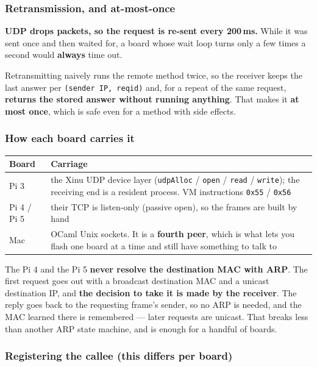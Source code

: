 \documentclass[11pt,a4paper]{article}
\begin{document}
\subsubsection*{Retransmission, and at-most-once}

\textbf{UDP drops packets, so the request is re-sent every 200\,ms.} While it
was sent once and then waited for, a board whose wait loop turns only a few
times a second would \textbf{always} time out.

Retransmitting naively runs the remote method twice, so the receiver keeps the
last answer per \texttt{(sender IP, reqid)} and, for a repeat of the same
request, \textbf{returns the stored answer without running anything}. That makes
it \textbf{at most once}, which is safe even for a method with side effects.

\subsubsection*{How each board carries it}

\begin{center}
\small
\begin{tabular}{@{}lp{8.4cm}@{}}
\toprule
Board & Carriage \\
\midrule
Pi 3 & the Xinu UDP device layer (\texttt{udpAlloc} / \texttt{open} /
       \texttt{read} / \texttt{write}); the receiving end is a resident process.
       VM instructions \texttt{0x55} / \texttt{0x56} \\
Pi 4 / Pi 5 & their TCP is listen-only (passive open), so the frames are built
       by hand \\
Mac & OCaml Unix sockets. It is a \textbf{fourth peer}, which is what lets you
       flash one board at a time and still have something to talk to \\
\bottomrule
\end{tabular}
\end{center}

The Pi 4 and the Pi 5 \textbf{never resolve the destination MAC with ARP}. The
first request goes out with a broadcast destination MAC and a unicast
destination IP, and \textbf{the decision to take it is made by the receiver}.
The reply goes back to the requesting frame's sender, so no ARP is needed, and
the MAC learned there is remembered --- later requests are unicast. That breaks
less than another ARP state machine, and is enough for a handful of boards.

\subsubsection*{Registering the callee (this differs per board)}
\end{document}
